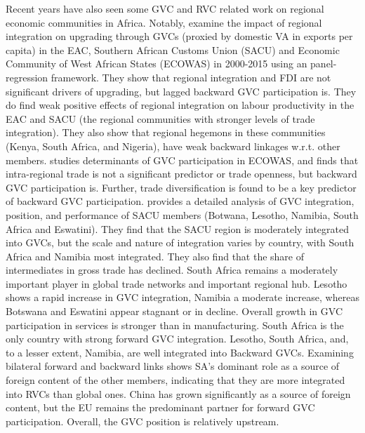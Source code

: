 \documentclass[a4paper]{article}
\begin{document}
Recent years have also seen some GVC and RVC related work on regional economic communities in Africa. Notably, \citet{obasaju2021regional} examine the impact of regional integration on upgrading through GVCs (proxied by domestic VA in exports per capita) in the EAC, Southern African Customs Union (SACU) and Economic Community of West African States (ECOWAS) in 2000-2015 using an panel-regression framework. They show that regional integration and FDI are not significant drivers of upgrading, but lagged backward GVC participation is. They do find weak positive effects of regional integration on labour productivity in the EAC and SACU (the regional communities with stronger levels of trade integration). They also show that regional hegemons in these communities (Kenya, South Africa, and Nigeria), have weak backward linkages w.r.t. other members. \citet{tinta2017determinants} studies determinants of GVC participation in ECOWAS, and finds that intra-regional trade is not a significant predictor or trade openness, but backward GVC participation is. Further, trade diversification is found to be a key predictor of backward GVC participation. \citet{engel2016sacu} provides a detailed analysis of GVC integration, position, and performance of SACU members (Botwana, Lesotho, Namibia, South Africa and Eswatini). They find that the SACU region is moderately integrated into GVCs, but the scale and nature of integration varies by country, with South Africa and Namibia most integrated. They also find that  the share of intermediates in gross trade has declined. South Africa remains a moderately important player in global trade networks and important regional hub. Lesotho shows a rapid increase in GVC integration, Namibia a moderate increase, whereas Botswana and Eswatini appear stagnant or in decline. Overall growth in GVC participation in services is stronger than in manufacturing.  South Africa is the only country with strong forward GVC integration. Lesotho, South Africa, and, to a lesser extent, Namibia, are well integrated into Backward GVCs. Examining bilateral forward and backward links shows SA's dominant role as a source of foreign content of the other members, indicating that they are more integrated into RVCs than global ones. China has grown significantly as a source of foreign content, but the EU remains the predominant partner for forward GVC participation. Overall, the GVC position is relatively upstream. 
 \newline 

\end{document}
